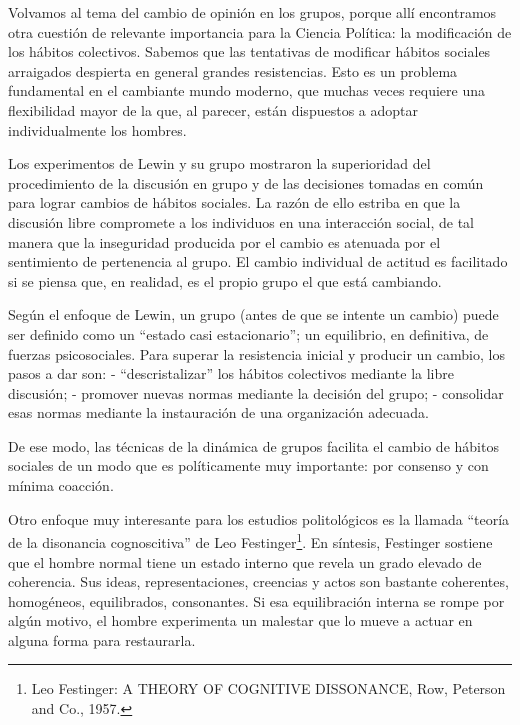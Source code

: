 \documentclass[
]{book}
\begin{document}
Volvamos al tema del cambio de opinión en los grupos, porque allí encontramos otra cuestión de relevante importancia para la Ciencia Política: la modificación de los hábitos colectivos. Sabemos que las tentativas de modificar hábitos sociales arraigados despierta en general grandes resistencias. Esto es un problema fundamental en el cambiante mundo moderno, que muchas veces requiere una flexibilidad mayor de la que, al parecer, están dispuestos a adoptar individualmente los hombres.

Los experimentos de Lewin y su grupo mostraron la superioridad del procedimiento de la discusión en grupo y de las decisiones tomadas en común para lograr cambios de hábitos sociales. La razón de ello estriba en que la discusión libre compromete a los individuos en una interacción social, de tal manera que la inseguridad producida por el cambio es atenuada por el sentimiento de pertenencia al grupo. El cambio individual de actitud es facilitado si se piensa que, en realidad, es el propio grupo el que está cambiando.

Según el enfoque de Lewin, un grupo (antes de que se intente un cambio) puede ser definido como un ``estado casi estacionario''; un equilibrio, en definitiva, de fuerzas psicosociales. Para superar la resistencia inicial y producir un cambio, los pasos a dar son: - ``descristalizar'' los hábitos colectivos mediante la libre discusión; - promover nuevas normas mediante la decisión del grupo; - consolidar esas normas mediante la instauración de una organización adecuada.

De ese modo, las técnicas de la dinámica de grupos facilita el cambio de hábitos sociales de un modo que es políticamente muy importante: por consenso y con mínima coacción.

Otro enfoque muy interesante para los estudios politológicos es la llamada ``teoría de la disonancia cognoscitiva'' de Leo Festinger\footnote{Leo Festinger: A THEORY OF COGNITIVE DISSONANCE, Row, Peterson and Co., 1957.}. En síntesis, Festinger sostiene que el hombre normal tiene un estado interno que revela un grado elevado de coherencia. Sus ideas, representaciones, creencias y actos son bastante coherentes, homogéneos, equilibrados, consonantes. Si esa equilibración interna se rompe por algún motivo, el hombre experimenta un malestar que lo mueve a actuar en alguna forma para restaurarla.
\end{document}
